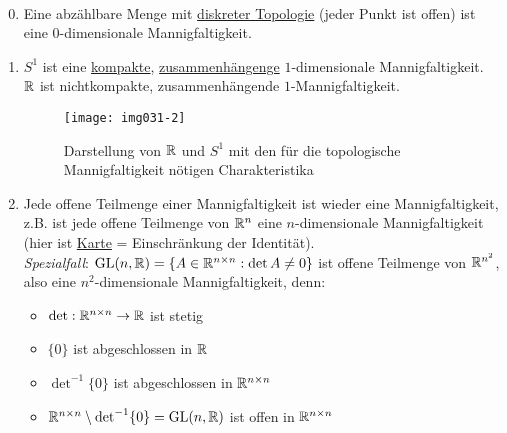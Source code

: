\begin{example}
  \
  \begin{enumerate}
    \setcounter{enumi}{-1}

    \item Eine abzählbare Menge mit \hyperref[bsp:diskreteTopologie]{diskreter Topologie} (jeder Punkt ist offen) ist eine $ 0 $-dimensionale Mannigfaltigkeit.

    \item $ S^1 $ ist eine \hyperref[def:kompakt]{kompakte}, \hyperref[def:zusammenhaengend]{zusammenhängenge} $ 1 $-dimensionale Mannigfaltigkeit. \\
      $ \mathbb{R} $ ist nichtkompakte, zusammenhängende $ 1 $-Mannigfaltigkeit.

    \begin{figure}[H]
      \label{img031-2}
      \texttt{[image: img031-2]}
      \captionsetup{width=.5\textwidth}
      \caption{Darstellung von $ \mathbb{R} $ und $ S^1 $ mit den für die topologische Mannigfaltigkeit nötigen Charakteristika}
    \end{figure}

    \item Jede offene Teilmenge einer Mannigfaltigkeit ist wieder eine Mannigfaltigkeit, z.B. ist jede offene Teilmenge von $ \mathbb{R}^n $ eine $ n $-dimensionale Mannigfaltigkeit (hier ist \hyperref[def:karte]{Karte} = Einschränkung der Identität). \\
    \emph{Spezialfall}: $ \text{GL}(n,\mathbb{R}) = \{ A \in \mathbb{R}^{n \times n} : \det A \neq 0 \} $ ist offene Teilmenge von $ \mathbb{R}^{n^2} $, also eine $ n^2 $-dimensionale Mannigfaltigkeit, denn:
    \begin{itemize}
      \item $ \det : \mathbb{R}^{n \times n} \to \mathbb{R} $ ist stetig
      \item $ \{ 0 \} $ ist abgeschlossen in $ \mathbb{R} $ 
      \item $ \det^{-1} \{ 0 \} $ ist abgeschlossen in $ \mathbb{R}^{n \times n} $
      \item $ \mathbb{R}^{n \times n} \setminus \det^{-1} \{ 0 \} = \text{GL}(n,\mathbb{R} ) $ ist offen in $ \mathbb{R}^{n \times n} $
    \end{itemize}


\end{enumerate}
\end{example}

